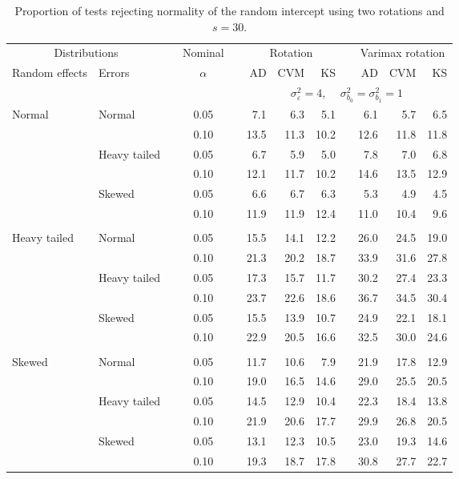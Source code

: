\begin{table}[ht]
\centering
\caption{\label{tab:fixedsimb030} Proportion of tests rejecting normality of the random intercept using two rotations and $s = 30$.}
\begin{scriptsize}
\begin{tabular}{ll p{.1cm} c p{.1cm} rrr p{.1cm} rrr}
  \hline
  \multicolumn{2}{c}{Distributions}& & Nominal & &  \multicolumn{3}{c}{Rotation} & & \multicolumn{3}{c}{Varimax rotation} \\ \cline{1-2} \cline{6-8} \cline{10-12}   
  Random effects & Errors & & $\alpha$ & & AD & CVM & KS & & AD & CVM & KS \\ 
   \hline
& && && \multicolumn{7}{c}{$\sigma_{\varepsilon}^2 = 4$, \ \ $\sigma_{b_0}^2 = \sigma_{b_1}^2 = 1$} \\ \cline{6-12}
\rowcolor{gray!20} Normal & Normal &  & 0.05 &  & 7.1 & 6.3 & 5.1 &  & 6.1 & 5.7 & 6.5 \\ 
\rowcolor{gray!20}    &  &  & 0.10 &  & 13.5 & 11.3 & 10.2 &  & 12.6 & 11.8 & 11.8 \\ 
\rowcolor{gray!20}    & Heavy tailed &  & 0.05 &  & 6.7 & 5.9 & 5.0 &  & 7.8 & 7.0 & 6.8 \\ 
\rowcolor{gray!20}    &  &  & 0.10 &  & 12.1 & 11.7 & 10.2 &  & 14.6 & 13.5 & 12.9 \\ 
\rowcolor{gray!20}    & Skewed &  & 0.05 &  & 6.6 & 6.7 & 6.3 &  & 5.3 & 4.9 & 4.5 \\ 
\rowcolor{gray!20}    &  &  & 0.10 &  & 11.9 & 11.9 & 12.4 &  & 11.0 & 10.4 & 9.6 \\ 
&&&&&&&&&&&\\
  Heavy tailed & Normal &  & 0.05 &  & 15.5 & 14.1 & 12.2 &  & 26.0 & 24.5 & 19.0 \\ 
   &  &  & 0.10 &  & 21.3 & 20.2 & 18.7 &  & 33.9 & 31.6 & 27.8 \\ 
   & Heavy tailed &  & 0.05 &  & 17.3 & 15.7 & 11.7 &  & 30.2 & 27.4 & 23.3 \\ 
   &  &  & 0.10 &  & 23.7 & 22.6 & 18.6 &  & 36.7 & 34.5 & 30.4 \\ 
   & Skewed &  & 0.05 &  & 15.5 & 13.9 & 10.7 &  & 24.9 & 22.1 & 18.1 \\ 
   &  &  & 0.10 &  & 22.9 & 20.5 & 16.6 &  & 32.5 & 30.0 & 24.6 \\ 
&&&&&&&&&&&\\
  Skewed & Normal &  & 0.05 &  & 11.7 & 10.6 & 7.9 &  & 21.9 & 17.8 & 12.9 \\ 
   &  &  & 0.10 &  & 19.0 & 16.5 & 14.6 &  & 29.0 & 25.5 & 20.5 \\ 
   & Heavy tailed &  & 0.05 &  & 14.5 & 12.9 & 10.4 &  & 22.3 & 18.4 & 13.8 \\ 
   &  &  & 0.10 &  & 21.9 & 20.6 & 17.7 &  & 29.9 & 26.8 & 20.5 \\ 
   & Skewed &  & 0.05 &  & 13.1 & 12.3 & 10.5 &  & 23.0 & 19.3 & 14.6 \\ 
   &  &  & 0.10 &  & 19.3 & 18.7 & 17.8 &  & 30.8 & 27.7 & 22.7 \\ 


\end{tabular}
\end{scriptsize}
\end{table}
